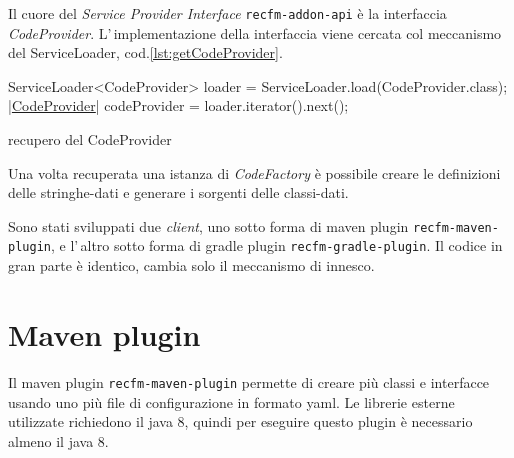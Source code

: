 \documentclass[a4paper,10pt]{report}
\newif\ifesource
\newenvironment{elisting}[1][H]
  {\captionsetup{aboveskip=0pt}\begin{listing}[#1]}
  {\end{listing}%
}
\begin{document}
Il cuore del \textsl{Service Provider Interface} \verb!recfm-addon-api! è la
interfaccia \textsl{CodeProvider}. L'\,implementazione della interfaccia
viene cercata col meccanismo del ServiceLoader, cod.\ref{lst:getCodeProvider}.

\ifesource
\begin{figure*}[!htb]
\begin{lstlisting}[language=java, caption=recupero del CodeProvider, 
label=lst:getCodeProvider]
        ServiceLoader<CodeProvider> loader = ServiceLoader.load(CodeProvider.class);
        (*\hyperref[lst:CodeProvider]{CodeProvider}*) codeProvider = loader.iterator().next();
\end{lstlisting}
\end{figure*}
\else
\begin{elisting}[!htb]
\begin{javacode}
        ServiceLoader<CodeProvider> loader = ServiceLoader.load(CodeProvider.class);
        |\hyperref[lst:CodeProvider]{CodeProvider}| codeProvider = loader.iterator().next();
\end{javacode}
\caption{recupero del CodeProvider}
\label{lst:getCodeProvider}
\end{elisting}
\fi

Una volta recuperata una istanza di \textsl{CodeFactory} è possibile creare le
definizioni delle stringhe-dati e generare i sorgenti delle classi-dati.

Sono stati sviluppati due \textsl{client}, uno sotto forma di maven plugin 
\verb!recfm-maven-plugin!, e l'\,altro sotto forma di gradle plugin 
\verb!recfm-gradle-plugin!. Il codice in gran parte è identico, cambia solo il 
meccanismo di innesco.

\section{Maven plugin}
Il maven plugin \verb!recfm-maven-plugin! permette di creare più classi e 
interfacce usando uno più file di configurazione in formato yaml.
Le librerie esterne utilizzate richiedono il java 8, quindi per eseguire questo 
plugin è necessario almeno il java 8.
\end{document}
